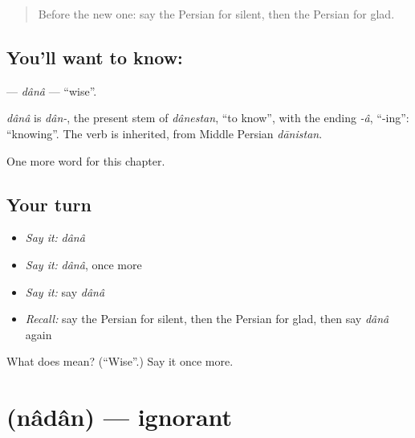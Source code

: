 \label{lesson:FA-C129-dana}



\begin{quote}
Before the new one: say the Persian for silent, then the Persian for glad.
\end{quote}

\subsection*{You'll want to know: }
\textbf{} — \emph{dânâ} — \textquotedblleft{}wise\textquotedblright{}.

\begin{cousinweb}
\emph{dânâ} is \emph{dân-}, the present stem of \emph{dânestan}, \textquotedblleft{}to know\textquotedblright{}, with the ending \emph{-â}, \textquotedblleft{}-ing\textquotedblright{}: \textquotedblleft{}knowing\textquotedblright{}. The verb is inherited, from Middle Persian \emph{dānistan}.
\end{cousinweb}

\begin{grammarlens}[title={What you've built}]
One more word for this chapter.
\end{grammarlens}

\subsection*{Your turn}
\begin{itemize}
\raggedright
  \item \emph{Say it:} \emph{dânâ}
  \item \emph{Say it:} \emph{dânâ}, once more
  \item \emph{Say it:} say \emph{dânâ}
  \item \emph{Recall:} say the Persian for silent, then the Persian for glad, then say \emph{dânâ} again
\end{itemize}

\begin{tcolorbox}[breakable,colback=teal!4,colframe=teal!35!black,title={Before you move on}]
What does  mean? (\textquotedblleft{}Wise\textquotedblright{}.) Say it once more.
\end{tcolorbox}
\section[\texorpdfstring{\fa{نادان} (nâdân)}{نادان (nâdân)}]{ (nâdân) — ignorant}


